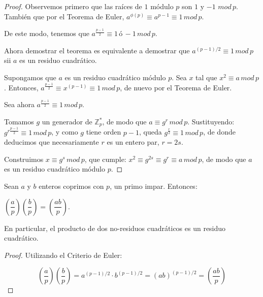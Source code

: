 \begin{proof}
	Observemos primero que las raíces de $1$ módulo $p$ son $1$ y $-1$ $mod\, p$. También que por el Teorema de Euler, $a^{\phi(p)} \equiv a^{p-1} \equiv 1 \, mod \, p$.
	
	De este modo, tenemos que $ a^{\frac{p-1}{2}} \equiv 1 \, ó \, -1 \, mod \, p$.
	
	Ahora demostrar el teorema es equivalente a demostrar que $a^{(p-1)/2} \equiv 1 \, mod \, p$ sii $a$ es un residuo cuadrático.
	
	\hfil
	
	Supongamos que $a$ es un residuo cuadrático módulo $p$. Sea $x$ tal que $x^2 \equiv a \, mod \, p$. Entonces, $ a^{\frac{p-1}{2}} \equiv x^{(p-1)} \equiv 1 \, mod \, p$, de nuevo por el Teorema de Euler.
	
	\hfil
	
	Sea ahora  $ a^{\frac{p-1}{2}} \equiv 1 \, mod \, p$.
	
	Tomamos $g$ un generador de $\mathbb{Z}^*_p$, de modo que $a \equiv g^r \, mod \, p$. 
	Sustituyendo:
	 $ g^{r\frac{p-1}{2}} \equiv 1 \, mod \, p$, 
	 y como $g$ tiene orden $p-1$, queda $ g^{\frac{r}{2}} \equiv 1 \, mod \, p$, de donde deducimos que necesariamente $r$ es un entero par, $r = 2s$.
	 
	 Construimos $x \equiv g^s \, mod \, p$, que cumple:
	 $x^2 \equiv g^{2s} \equiv g^r \equiv a \, mod \, p$,
	 de modo que $a$ es un residuo cuadrático módulo $p$.
	
\end{proof}

\begin{proposition}
	Sean $a$ y $b$ enteros coprimos con $p$, un primo impar. Entonces:
	
\begin{center}
 	$
		\left( \dfrac{a}{p} \right) 	\left( \dfrac{b}{p} \right) = 	\left( \dfrac{ab}{p} \right) 
	$.
\end{center}
	
	En particular, el producto de dos no-residuos cuadráticos es un residuo cuadrático.
	
\end{proposition}

\begin{proof}
	Utilizando el Criterio de Euler:
	
	\[
			\left( \dfrac{a}{p} \right) 	\left( \dfrac{b}{p} \right) =
			a^{(p-1)/2} \cdot b^{(p-1)/2} = (ab)^{(p-1)/2} =
			 	\left( \dfrac{ab}{p} \right) 
	\]
	
\end{proof}

